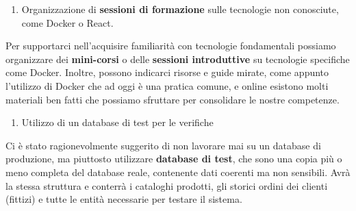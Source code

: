     \begin{enumerate}[resume*, itemsep=0pt, parsep=1pt, leftmargin=*, label=\arabic*.]
        \item Organizzazione di \textbf{sessioni di formazione} sulle tecnologie non conosciute, come Docker o React.
    \end{enumerate} \vspace{-0.5em}
    Per supportarci nell'acquisire familiarità con tecnologie fondamentali possiamo organizzare dei \textbf{mini-corsi} o delle \textbf{sessioni introduttive} su tecnologie specifiche come Docker. Inoltre, possono indicarci risorse e guide mirate, come appunto l'utilizzo di Docker che ad oggi è una pratica comune, e online esistono molti materiali ben fatti che possiamo sfruttare per consolidare le nostre competenze.

    \begin{enumerate}[resume*, itemsep=0pt, parsep=1pt, leftmargin=*, label=\arabic*.]
        \item Utilizzo di un database di test per le verifiche
    \end{enumerate} \vspace{-0.5em}
    Ci è stato ragionevolmente suggerito di non lavorare mai su un database di produzione, ma piuttosto utilizzare \textbf{database di test}, che sono una copia più o meno completa del database reale, contenente dati coerenti ma non sensibili. Avrà la stessa struttura e conterrà i cataloghi prodotti, gli storici ordini dei clienti (fittizi) e tutte le entità necessarie per testare il sistema.

